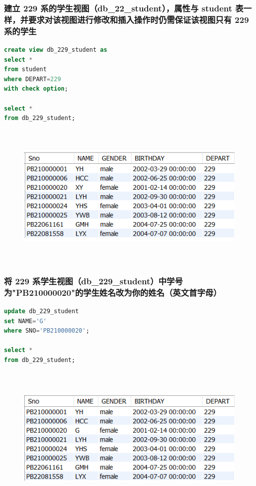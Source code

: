 \documentclass{ctexart}
\begin{document}
\subsubsection{建立 229 系的学生视图（db\_22\_student），属性与 student 表一样，并要求对该视图进行修改和插入操作时仍需保证该视图只有 229 系的学生}
\begin{lstlisting}[language=sql]
create view db_229_student as
select *
from student
where DEPART=229
with check option;

select *
from db_229_student;	
\end{lstlisting}
\begin{figure}[H]
	\centering 
	\includegraphics[height=7cm,width=14cm]{46.png}
	\end{figure}
\subsubsection{将 229 系学生视图（db\_229\_student）中学号为"PB210000020"的学生姓名改为{你的姓名（英文首字母）}}
\begin{lstlisting}[language=sql]
update db_229_student
set NAME='G'
where SNO='PB210000020';

select *
from db_229_student;

\end{lstlisting}
\begin{figure}[H]
	\centering 
	\includegraphics[height=7cm,width=14cm]{47.png}
	\end{figure}
\end{document}
